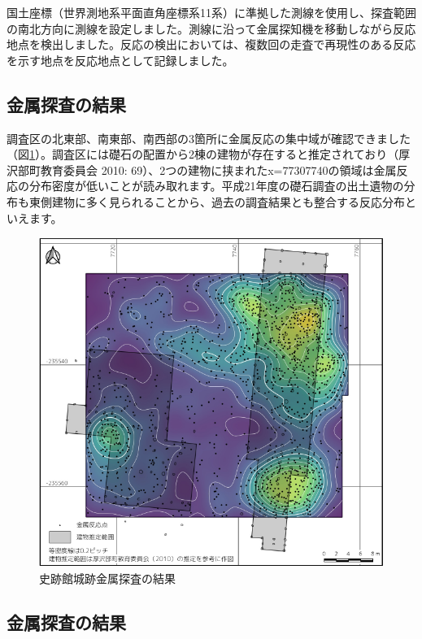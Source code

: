 \documentclass[a4j,11pt,twocolumn,openany]{jsbook}
\begin{document}
国土座標（世界測地系平面直角座標系11系）に準拠した測線を使用し、探査範囲の南北方向に測線を設定しました。測線に沿って金属探知機を移動しながら反応地点を検出しました。反応の検出においては、複数回の走査で再現性のある反応を示す地点を反応地点として記録しました。


\subsection{金属探査の結果}

調査区の北東部、南東部、南西部の3箇所に金属反応の集中域が確認できました（図\ref{res}）。調査区には礎石の配置から2棟の建物が存在すると推定されており（厚沢部町教育委員会 2010: 69）、2つの建物に挟まれたx=77307740の領域は金属反応の分布密度が低いことが読み取れます。平成21年度の礎石調査の出土遺物の分布も東側建物に多く見られることから、過去の調査結果とも整合する反応分布といえます。

\begin{figure}[ht]
	\centering
	\includegraphics[width=\linewidth]{fig/07_Ishii/Metal_survey_result.pdf}
	\caption{史跡館城跡金属探査の結果}
	\label{res}
\end{figure}

\subsection{金属探査の結果}
\end{document}
